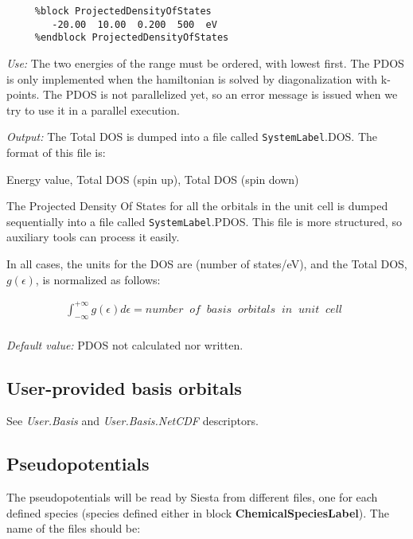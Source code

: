 \documentclass[11pt]{article}
\begin{document}
\begin{description}
\begin{verbatim}
     %block ProjectedDensityOfStates
        -20.00  10.00  0.200  500  eV
     %endblock ProjectedDensityOfStates
\end{verbatim}

{\it Use:} The two energies of the range must be ordered, with lowest
first.  The PDOS is only implemented when the hamiltonian is solved by
diagonalization with k-points.  The PDOS is not parallelized yet, so
an error message is issued when we try to use it in a parallel
execution.

{\it Output:} The Total DOS is dumped into a file
called {\tt SystemLabel}.DOS. The format of this file is:

Energy value, Total DOS (spin up), Total DOS (spin down)

The Projected Density Of States for all the orbitals in the unit cell
is dumped sequentially into a file called {\tt SystemLabel}.PDOS. This
file is more structured, so auxiliary tools can process it easily.

In all cases, the units for the DOS are (number of states/eV), and the
Total DOS, $g \left(\epsilon\right)$, is normalized as follows:

\begin{eqnarray}
   \int_{-\infty}^{+\infty} g \left(\epsilon\right) d\epsilon = 
   number \;\; of \;\; basis \;\; orbitals \;\; in \;\;  unit \;\; cell \;\;
   \nonumber \\
\end{eqnarray}


{\it Default value:} PDOS not calculated nor written.

\end{description}
        

\subsection{User-provided basis orbitals}

See {\it User.Basis} and {\it User.Basis.NetCDF} descriptors.

\subsection{Pseudopotentials}

The pseudopotentials will be read by {\sc Siesta} from different files, one
for each defined species (species defined either in block
{\bf ChemicalSpeciesLabel}).
The name of the files should be:
\end{document}
